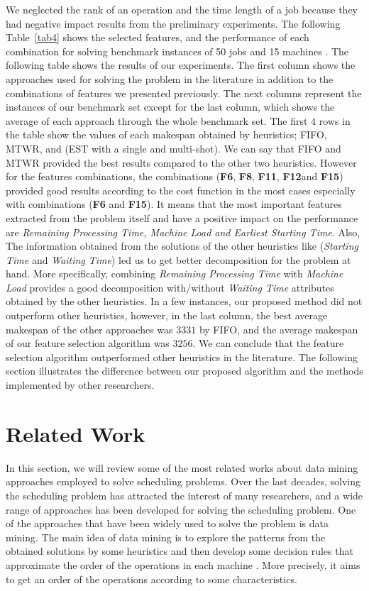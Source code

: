 \documentclass[runningheads]{llncs}
\begin{document}
We neglected the rank of an operation and the time length of a job because they had negative impact results from the preliminary experiments. The following Table~\ref{tab4} shows the selected features, and the performance of each combination for solving benchmark instances of 50 jobs and 15 machines \cite{taillard1993benchmarks}. The following table shows the results of our experiments. The first column shows the approaches used for solving the problem in the literature in addition to the combinations of features we presented previously. The next columns represent the instances of our benchmark set except for the last column, which shows the average of each approach through the whole benchmark set. The first $4$ rows in the table show the values of each makespan obtained by heuristics; FIFO, MTWR, and (EST with a single and multi-shot). We can say that FIFO and MTWR provided the best results compared to the other two heuristics. However for the features combinations, the combinations (\textbf{F6}, \textbf{F8}, \textbf{F11}, \textbf{F12}and \textbf{F15}) provided good results according to the cost function in the most cases especially with combinations (\textbf{F6} and \textbf{F15}). It means that the most important features extracted from the problem itself and have a positive impact on the performance are \textit{Remaining Processing Time, Machine Load and Earliest Starting Time}. Also, The information obtained from the solutions of the other heuristics like (\textit{Starting Time} and \textit{Waiting Time}) led us to get better decomposition for the problem at hand. More specifically, combining \textit{Remaining Processing Time} with \textit{Machine Load} provides a good decomposition with/without \textit{Waiting Time} attributes obtained by the other heuristics. In a few instances, our proposed method did not outperform other heuristics, however, in the last column, the best average makespan of the other approaches was $3331$ by FIFO, and the average makespan of our feature selection algorithm was $3256$. We can conclude that the feature selection algorithm outperformed other heuristics in the literature. The following section illustrates the difference between our proposed algorithm and the methods implemented by other researchers.




\section{Related Work}
\label{sec:literature}
In this section, we will review some of the most related works about data mining approaches employed to solve scheduling problems. Over the last decades, solving the scheduling problem has attracted the interest of many researchers, and a wide range of approaches has been developed for solving the scheduling problem. One of the approaches that have been widely used to solve the problem is data mining. The main idea of data mining is to explore the patterns from the obtained solutions by some heuristics and then develop some decision rules that approximate the order of the operations in each machine \cite{ismail2012production}. More precisely, it aims to get an order of the operations according to some characteristics.
\end{document}
